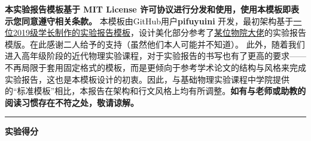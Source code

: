 {	\textbf{本实验报告模板基于 MIT License 许可协议进行分发和使用，使用本模板即表示您同意遵守相关条款。}
	本模板由GitHub用户\textbf{pifuyuini} 开发，最初架构基于\href{https://huanyushi.github.io/posts/labreport-template/}{一位2019级学长制作的实验报告模板}，设计美化部分参考了\href{https://www.yykspace.com/cn/index.html}{某位物院大佬}的实验报告模版。在此感谢二人给予的支持（虽然他们本人可能并不知道）。
	此外，随着我们进入高年级阶段的近代物理实验课程，对于实验报告的书写也有了更高的要求——不再局限于套用固定格式的模板，而是更倾向于参考学术论文的结构与风格来完成实验报告，这也是本模板设计的初衷。因此，与基础物理实验课程中学院提供的“标准模板”相比，本报告在架构和行文风格上均有所调整。\textbf{如有与老师或助教的阅读习惯存在不符之处，敬请谅解。}
	
	\noindent\textcolor{StructureColor}{\rule{\textwidth}{1.5pt} }
	
	\noindent\textcolor{StructureColor}{\textbf{实验得分}}
	
	\scoresTable{}{}{}{}{}{}{}{}
}

\newcommand{\YsyEmph}[1]{
	\textbf{\textcolor{EmphColor}{#1}}
}

\newcommand{\scoresTable}[8]{
	\begin{table}[h!]
		\renewcommand\arraystretch{1.7}
		\begin{tabularx}{\textwidth}{
				|X|X|X|X
				|X|X|X|X|}
			\hline
			\multicolumn{2}{|c|}{预习报告} & \multicolumn{2}{|c|}{实验记录} & \multicolumn{2}{|c|}{分析讨论} & \multicolumn{2}{|c|}{总成绩} \\
			\hline
			\centering#1&\centering#2 &\centering#3 &\centering#4 &\centering#5 &\centering#6 &\centering#7 &{\centering#8} \\
			\hline
		\end{tabularx}
	\end{table}
}



\newcommand{\tensor}[3]{#1^{\mathrm{#2}}_{\phantom{#2}\mathrm{#3}}} %

\newcommand{\Diff}{\mathrm{d}} %
\newcommand{\Der}[2]{\dfrac{\mathrm{d}#1}{\mathrm{d}#2}} %
\newcommand{\EulerE}{\mathrm{e}} %
\newcommand{\ImgI}{\mathrm{i}} %
\newcommand{\DV}[2]{#1_{\mathrm{#2}}} %
\newcommand{\LA}[1]{\boldsymbol{#1}} %